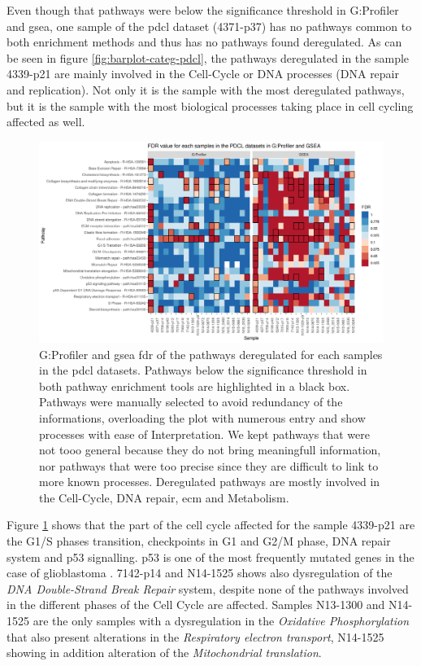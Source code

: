 Even though that pathways were below the significance threshold in G:Profiler and \acrshort{gsea}, one sample of the \acrshort{pdcl} dataset (4371-p37) has no pathways common to both enrichment methods and thus has no pathways found deregulated.
As can be seen in figure \ref*{fig:barplot-categ-pdcl}, the pathways deregulated in the sample 4339-p21 are mainly involved in the Cell-Cycle or DNA processes (DNA repair and replication).
Not only it is the sample with the most deregulated pathways, but it is the sample with the most biological processes taking place in cell cycling affected as well.

\begin{figure}
    \includegraphics[width=\textwidth]{img/heatmap-fdr-pathway}
    \caption{
        G:Profiler and \acrshort{gsea} \acrfull{fdr} of the pathways deregulated for each samples in the \acrshort{pdcl} datasets.
        Pathways below the significance threshold in both pathway enrichment tools are highlighted in a black box.
        Pathways were manually selected to avoid redundancy of the informations, overloading the plot with numerous entry and show processes with ease of Interpretation.
        We kept pathways that were not tooo general because they do not bring meaningfull information, nor pathways that were too precise since they are difficult to link to more known processes.        
        Deregulated pathways are mostly involved in the Cell-Cycle, DNA repair, \acrlong{ecm} and Metabolism.
    }
    \label{fig:heatmap-fdr-pathway}
\end{figure}

Figure \ref*{fig:heatmap-fdr-pathway} shows that the part of the cell cycle affected for the sample 4339-p21 are the G1/S phases transition, checkpoints in G1 and G2/M phase, DNA repair system and p53 signalling.
p53 is one of the most frequently mutated genes in the case of glioblastoma \cite*{McLendon2008}.
7142-p14 and N14-1525 shows also dysregulation of the \textit{DNA Double-Strand Break Repair} system, despite none of the pathways involved in the different phases of the Cell Cycle are affected.
Samples N13-1300 and N14-1525 are the only samples with a dysregulation in the \textit{Oxidative Phosphorylation} that also present alterations in the \textit{Respiratory electron transport}, N14-1525 showing in addition alteration of the \textit{Mitochondrial translation}.
